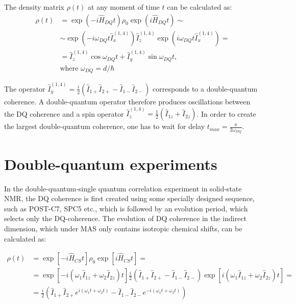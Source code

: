 \documentclass[a4paper, 12pt]{article}
\begin{document}
The density matrix $\rho(t)$ at any moment of time $t$  can be calculated as:
\begin{equation}
\begin{split}
\rho(t) &= \exp (-i\hat{H}_{DQ}t) \rho_0  \exp (i\hat{H}_{DQ}t) \sim \\
 &\sim \exp (-i \omega_{DQ} t \hat{I}_{x}^{(1,4)}) \hat{I}_{z}^{(1,4)}  \exp (i \omega_{DQ} t \hat{I}_{x}^{(1,4)}) = \\
 &= \hat{I}_{z}^{(1,4)} \cos{\omega_{DQ} t} +  \hat{I}_{y}^{(1,4)} \sin{\omega_{DQ} t}, \\
 & \text{where } \omega_{DQ} = d/\hbar
\end{split}
\end{equation}

The operator $\hat{I}_{y}^{(1,4)} = \frac{i}{2}( \hat{I}_{1+} \hat{I}_{2+} - \hat{I}_{1-} \hat{I}_{2-}) $ corresponds to a double-quantum coherence. A double-quantum operator therefore produces oscillations between the DQ coherence and a spin operator $\hat{I}_z^{(1,4)} = \frac{1}{2}(\hat{I}_{1z}+\hat{I}_{2z})$. In order to create the largest double-quantum coherence, one has to wait for delay $t_{max} = \frac{\pi}{2 \omega_{DQ}}$.

\section{Double-quantum experiments}

In the double-quantum-single quantum correlation experiment in solid-state NMR, the DQ coherence is first created using some specially designed sequence, such as POST-C7, SPC5 etc., which is followed by an evolution period, which selects only the DQ-coherence. The evolution of DQ coherence in the indirect dimension, which under MAS only contains isotropic chemical shifts, can be calculated as:

\begin{equation} 
 \begin{split}
  \rho(t) &= \exp[-i \hat{H}_{CS}t] \rho_0 \exp[ i \hat{H}_{CS}t] = \\
  &=  \exp[-i(\omega_1 \hat{I}_{1z}  + \omega_2 \hat{I}_{2z})t] \frac{i}{2}( \hat{I}_{1+} \hat{I}_{2+} - \hat{I}_{1-} \hat{I}_{2-}) \exp[ i(\omega_1 \hat{I}_{1z}  + \omega_2 \hat{I}_{2z})t] = \\
  &=  \frac{i}{2}( \hat{I}_{1+} \hat{I}_{2+} e^{i(\omega_1 t + \omega_2 t )} - \hat{I}_{1-} \hat{I}_{2-} e^{-i(\omega_1 t + \omega_2 t )}) 
 \end{split}
\end{equation}
\end{document}
